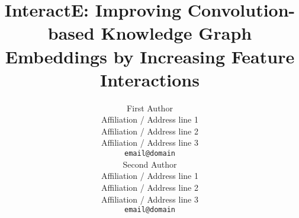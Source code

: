 \documentclass[11pt,a4paper]{article}
\title{InteractE: Improving Convolution-based Knowledge Graph Embeddings by Increasing Feature Interactions}
\author{First Author \\
  Affiliation / Address line 1 \\
  Affiliation / Address line 2 \\
  Affiliation / Address line 3 \\
  {\tt email@domain} \\\And
  Second Author \\
  Affiliation / Address line 1 \\
  Affiliation / Address line 2 \\
  Affiliation / Address line 3 \\
  {\tt email@domain} \\}
\date{}
\begin{document}
\newcommand{\refalg}[1]{Algorithm \ref{#1}}
\newcommand{\refeqn}[1]{Equation \ref{#1}}
\newcommand{\reffig}[1]{Figure \ref{#1}}
\newcommand{\reftbl}[1]{Table \ref{#1}}
\newcommand{\refsec}[1]{Section \ref{#1}}




\newcommand{\datafb}{FB15k}
\newcommand{\datawn}{WN18}
\newcommand{\datafbn}{FB15k-237}
\newcommand{\datawnn}{WN18RR}
\newcommand{\datayago}{YAGO3-10}

\newcommand{\citet}[1]{\cite{#1}}

\newcommand{\emb}[1]{\ensuremath{\bm{e}_{#1}}}
\newcommand{\remb}[1]{\ensuremath{\bm{#1}_{r}}}

\newcommand{\reminder}[1]{\textcolor{red}{[[ #1 ]]}\typeout{#1}}
\newcommand{\reminderR}[1]{\textcolor{gray}{[[ #1 ]]}\typeout{#1}}

\newcommand{\add}[1]{\textcolor{red}{#1}\typeout{#1}}
\newcommand{\remove}[1]{\sout{#1}\typeout{#1}}

\newcommand{\m}[1]{\mathcal{#1}}
\newcommand{\method}{InteractE}

\newcommand{\problem}{DD}
\newcommand{\problemfull}{Document Dating}

\newtheorem{theorem}{Theorem}[section]
\newtheorem{claim}[theorem]{Claim}

\newcommand{\tensor}{\mathcal{X}}
\newcommand{\Real}{\ensuremath{\mathbb{R}}}
\newcommand{\Natural}{\ensuremath{\mathbb{N}}}
\newcommand{\Complex}{\ensuremath{\mathbb{C}}}
\newcommand{\tdot}[3]{\ensuremath{\langle #1, #2, #3 \rangle}}
\newcommand{\doubledot}[2]{\ensuremath{\langle #1, #2 \rangle}}
\newcommand{\bigO}[1]{\mathcal{O}(#1)}

\newcommand{\tuples}{\mathbb{T}}

\newcommand{\argmax}{arg\,max}
\newcommand\norm[1]{\left\lVert#1\right\rVert}
\newcommand{\note}[1]{\textcolor{blue}{#1}}

\newcommand*{\Scale}[2][4]{\scalebox{#1}{}}\newcommand*{\Resize}[2]{\resizebox{#1}{!}{}}

\makeatletter
\newcommand{\ostar}{\mathbin{\mathpalette\make@circled\star}}
\newcommand{\oast}{\mathbin{\mathpalette\make@circled\ast}}
\newcommand{\make@circled}[2]{\ooalign{\cr\hidewidth\hidewidth\cr}}
\newcommand{\smallbigcirc}[1]{\vcenter{\hbox{\scalebox{0.77778}{}}}}
\makeatother


\def\mat#1{\mbox{\bf #1}}

\theoremstyle{definition}
\newtheorem{definition}{Definition}[section]
 
\theoremstyle{proposition}
\newtheorem{proposition}{Proposition}[section]
\newtheorem*{lemma*}{Lemma}
\end{document}
